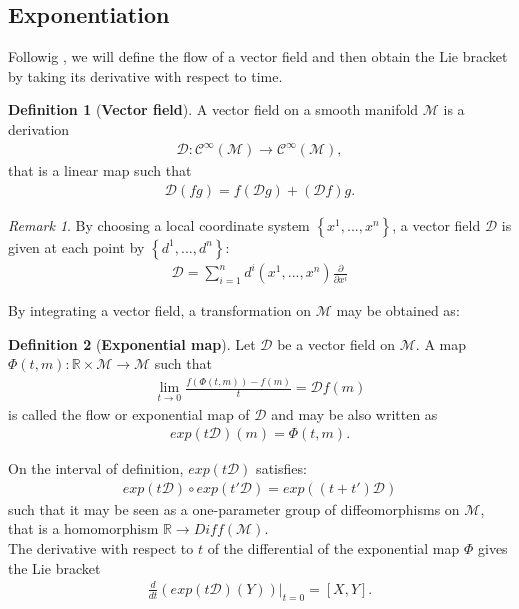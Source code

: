 \documentclass[12pt,a4paper]{report}
\theoremstyle{definition}
\newtheorem{definition}{Definition}
\theoremstyle{remark}
\newtheorem*{remark}{Remark}
\theoremstyle{remark}
\begin{document}
\subsection{Exponentiation}
Followig \cite{warner}, we will define the flow of a vector field and then obtain the Lie bracket by taking its derivative with respect to time.
\begin{definition}[\textbf{Vector field}]
A vector field on a smooth manifold $\mathcal{M}$ is a derivation
\begin{align*}
\mathcal{D}:\mathcal{C}^\infty(\mathcal{M})\rightarrow\mathcal{C}^\infty(\mathcal{M}),
\end{align*}
that is a linear map such that
\begin{align*}
\mathcal{D}(fg)=f(\mathcal{D}g)+(\mathcal{D}f)g.
\end{align*}
\end{definition}
\begin{remark}
By choosing a local coordinate system $\left\lbrace x^1,...,x^n \right\rbrace$, a vector field $\mathcal{D}$ is given at each point by $\left\lbrace d^1,...,d^n\right\rbrace$:
\begin{align*}
\mathcal{D}=\sum_{i=1}^nd^i(x^1,...,x^n)\frac{\partial}{\partial x^i}
\end{align*}
\end{remark}
By integrating a vector field, a transformation on $\mathcal{M}$ may be obtained as:
\begin{definition}[\textbf{Exponential map}]
Let $\mathcal{D}$ be a vector field on $\mathcal{M}$. A map $\Phi(t,m):\mathbb{R}\times\mathcal{M}\rightarrow\mathcal{M}$ such that
\begin{align*}
\lim_{t\rightarrow 0}\frac{f(\Phi(t,m))-f(m)}{t}=\mathcal{D}f(m)	
\end{align*}
is called the flow or exponential map of $\mathcal{D}$ and may be also written as
\begin{align*}
exp(t\mathcal{D})(m)=\Phi(t,m).
\end{align*}
\end{definition}
\noindent On the interval of definition, $exp(t\mathcal{D})$ satisfies:
\begin{align*}
exp(t\mathcal{D})\circ exp(t'\mathcal{D})=exp((t+t')\mathcal{D})
\end{align*}
such that it may be seen as a one-parameter group of diffeomorphisms on $\mathcal{M}$, that is a homomorphism $\mathbb{R}\rightarrow Diff(\mathcal{M})$. \\
The derivative with respect to $t$ of the differential of the exponential map $\Phi$ gives the Lie bracket
\begin{align*}
\frac{d}{dt}(exp(t\mathcal{D})(Y))\bigg\rvert_{t=0}=[X,Y].
\end{align*}
\end{document}

